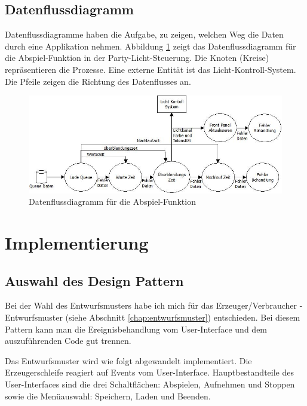 \subsection{Datenflussdiagramm}
Datenflussdiagramme haben die Aufgabe, zu zeigen, welchen Weg die Daten durch eine Applikation nehmen. Abbildung \ref{fig:plan02} zeigt das Datenflussdiagramm für die Abspiel-Funktion
in der Party-Licht-Steuerung. Die Knoten (Kreise) repräsentieren die Prozesse. 
Eine externe Entität ist das Licht-Kontroll-System. Die Pfeile zeigen die Richtung des Datenflusses an.
	\begin{figure}[!ht]
	\centering
		\includegraphics[width=\textwidth]{Pics/play-dataflow.jpeg}
	\caption{Datenflussdiagramm für die Abspiel-Funktion}
	\label{fig:plan02}
	\end{figure}	

	

\section{Implementierung}
\label{chap:impl}
		\subsection{Auswahl des Design Pattern} %
		\label{chap:designpattern} %
		Bei der Wahl des Entwurfsmusters habe ich mich für das Erzeuger/Verbraucher - Entwurfsmuster (siehe Abschnitt \ref{chap:entwurfsmuster}) entschieden.
		Bei diesem Pattern kann man die Ereignisbehandlung vom User-Interface und dem auszuführenden Code gut trennen. 

Das Entwurfsmuster wird wie folgt abgewandelt implementiert.  Die Erzeugerschleife reagiert auf Events vom User-Interface. 
Hauptbestandteile des User-Interfaces  sind die drei Schaltflächen: Abspielen, Aufnehmen und Stoppen sowie die Menüauswahl: Speichern, Laden und Beenden.

